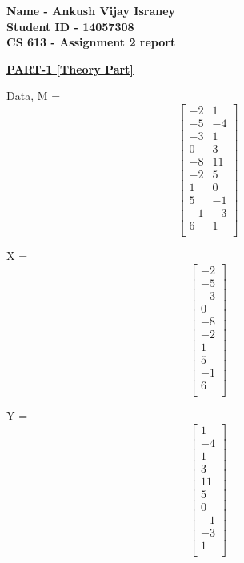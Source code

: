 \documentclass{report}
\begin{document}
 

\begin{flushleft}

\begin{Large}

\textbf{Name - Ankush Vijay Israney} \\
\textbf{Student ID - 14057308} \\
\textbf{CS 613 - Assignment 2 report} \\ 

\end{Large}

\break

\underline { \textbf{PART-1 [Theory Part]}}  \linebreak[2]

Data, M = 
\[
\begin{bmatrix}
-2 & 1 \\
-5 &-4 \\
-3 & 1 \\
0 & 3 \\
-8 & 11 \\
-2 & 5 \\
1 & 0 \\
5 & -1 \\
-1 & -3 \\
6 & 1 \\
\end{bmatrix}
\] \linebreak[2]

X = 
\[
\begin{bmatrix}
-2  \\
-5  \\
-3 \\
0 \\
-8  \\
-2 \\
1  \\
5  \\
-1 \\
6  \\
\end{bmatrix}
\]

Y = 
\[
\begin{bmatrix}
1 \\
-4 \\
1 \\
3 \\
11 \\
5 \\
0 \\
-1 \\
-3 \\
1 \\
\end{bmatrix}
\] \linebreak[2]


\end{flushleft}
\end{document}
